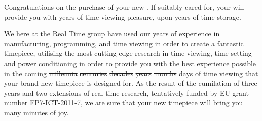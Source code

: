 
Congratulations on the purchase of your new \touchmore{}. If suitably cared for, your \touchmore{} will provide you with years of time viewing pleasure, upon years of time storage.

We here at the Real Time group have used our years of experience in manufacturing, programming, and time viewing in order to create a fantastic timepiece, utilising the most cutting edge research in time viewing, time setting and power conditioning in order to provide you with the best experience possible in the coming \st{millennia} \st{centuries} \st{decades} \st{years} \st{months} days of time viewing that your brand new timepiece is designed for. As the result of the cumilation of three years and two extensions of real-time research, tentatively funded by EU grant number FP7-ICT-2011-7, we are sure that your new timepiece will bring you many minutes of joy.